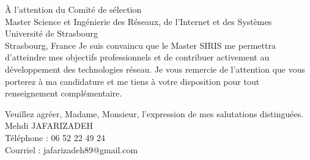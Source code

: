 \documentclass[11pt]{letter}
\begin{document}
\begin{letter}{%
À l'attention du Comité de sélection\\
Master Science et Ingénierie des Réseaux, de l'Internet et des Systèmes\\
Université de Strasbourg\\
Strasbourg, France}
Je suis convaincu que le Master SIRIS me permettra d'atteindre mes objectifs professionnels et de contribuer activement au développement des technologies réseau. Je vous remercie de l'attention que vous porterez à ma candidature et me tiens à votre disposition pour tout renseignement complémentaire.

Veuillez agréer, Madame, Monsieur, l'expression de mes salutations distinguées.\\

{Mehdi JAFARIZADEH\\

Téléphone : 06 52 22 49 24\\
\vspace{2mm}%
Courriel : jafarizadeh89@gmail.com\\
\vspace{2mm}%
}


\end{letter}
\end{document}
